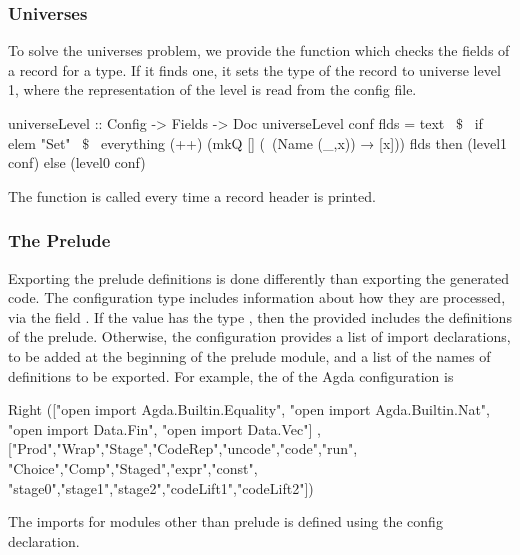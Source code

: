 \subsubsection{Universes}
To solve the universes problem, we provide the function  which checks the fields of a record for a  type. If it finds one, it sets the type of the record to universe level 1, where the representation of the level is read from the config file. 
\begin{hscode}
universeLevel :: Config -> Fields -> Doc
universeLevel conf flds =
  text ~$\$$~
    if elem "Set" ~$\$$~ everything (++) (mkQ [] (\ (Name (_,x)) → [x])) flds
    then (level1 conf) else (level0 conf)    
\end{hscode}
The function  is called every time a record header is printed. 

\subsubsection{The Prelude}
Exporting the prelude definitions is done differently than exporting the generated code. The configuration type includes information about how they are processed, via the field
. If the value has the type , then the provided includes the definitions of the prelude. Otherwise, the configuration provides a list of import declarations, to be added at the beginning of the prelude module, and a list of the names of definitions to be exported. 
For example, the  of the Agda configuration is 
\begin{hscode} 
 Right (["open import Agda.Builtin.Equality",
         "open import Agda.Builtin.Nat",
         "open import Data.Fin",
         "open import Data.Vec"]
      ,["Prod","Wrap","Stage","CodeRep","uncode","code","run",
        "Choice","Comp","Staged","expr","const",
        "stage0","stage1","stage2","codeLift1","codeLift2"])   
\end{hscode} 

The imports for modules other than prelude is defined using the  config declaration. 

